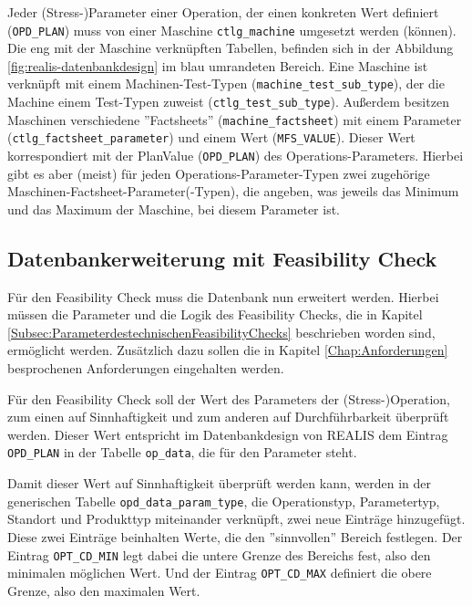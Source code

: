 Jeder (Stress-)Parameter einer Operation, der einen konkreten Wert definiert (\texttt{OPD\_PLAN}) muss von einer Maschine \texttt{ctlg\_machine} umgesetzt werden (können). Die eng mit der Maschine verknüpften Tabellen, befinden sich in der Abbildung \ref{fig:realis-datenbankdesign} im blau umrandeten Bereich. Eine Maschine ist verknüpft mit einem Machinen-Test-Typen (\texttt{machine\_test\_sub\_type}), der die Machine einem Test-Typen zuweist (\texttt{ctlg\_test\_sub\_type}). Außerdem besitzen Maschinen verschiedene ''Factsheets'' (\texttt{machine\_factsheet}) mit einem Parameter (\texttt{ctlg\_factsheet\_parameter}) und einem Wert (\texttt{MFS\_VALUE}). Dieser Wert korrespondiert mit der PlanValue (\texttt{OPD\_PLAN}) des Operations-Parameters. Hierbei gibt es aber (meist) für jeden Operations-Parameter-Typen zwei zugehörige Maschinen-Factsheet-Parameter(-Typen), die angeben, was jeweils das Minimum und das Maximum der Maschine, bei diesem Parameter ist.


\subsection{Datenbankerweiterung mit Feasibility Check}

Für den Feasibility Check muss die Datenbank nun erweitert werden. Hierbei müssen die Parameter und die Logik des Feasibility Checks, die in Kapitel \ref{Subsec:ParameterdestechnischenFeasibilityChecks} beschrieben worden sind, ermöglicht werden. Zusätzlich dazu sollen die in Kapitel \ref{Chap:Anforderungen} besprochenen Anforderungen eingehalten werden.

Für den Feasibility Check soll der Wert des Parameters der (Stress-)Operation, zum einen auf Sinnhaftigkeit und zum anderen auf Durchführbarkeit überprüft werden. Dieser Wert entspricht im Datenbankdesign von \gls{REALIS} dem Eintrag \texttt{OPD\_PLAN} in der Tabelle \texttt{op\_data}, die für den Parameter steht.

Damit dieser Wert auf Sinnhaftigkeit überprüft werden kann, werden in der generischen Tabelle \texttt{opd\_data\_param\_type}, die Operationstyp, Parametertyp, Standort und Produkttyp miteinander verknüpft, zwei neue Einträge hinzugefügt. Diese zwei Einträge beinhalten Werte, die den ''sinnvollen'' Bereich festlegen. Der Eintrag \texttt{OPT\_CD\_MIN} legt dabei die untere Grenze des Bereichs fest, also den minimalen möglichen Wert. Und der Eintrag \texttt{OPT\_CD\_MAX} definiert die obere Grenze, also den maximalen Wert.


